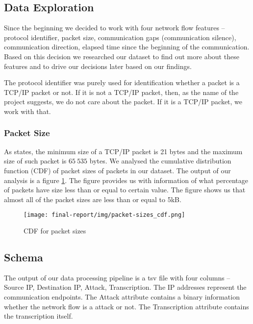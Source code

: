 \documentclass{article}
\begin{document}
    \subsection{Data Exploration}\label{sec-dataset-exploration}
    Since the beginning we decided to work with four network flow features -- protocol identifier, packet size, communication gaps (communication silence), communication direction, elapsed time since the beginning of the communication. Based on this decision we researched our dataset to find out more about these features and to drive our decisions later based on our findings.

    The protocol identifier was purely used for identification whether a packet is a TCP/IP packet or not. If it is not a TCP/IP packet, then, as the name of the project suggests, we do not care about the packet. If it is a TCP/IP packet, we work with that.

    \subsubsection{Packet Size}
    As \cite{oreilly-tcp} states, the minimum size of a TCP/IP packet is 21 bytes and the maximum size of such packet is $65\ 535$ bytes. We analysed the cumulative distribution function (CDF) of packet sizes of packets in our dataset. The output of our analysis is a figure \ref{fig-cdf-packet-sizes}. The figure provides us with information of what percentage of packets have size less than or equal to certain value. The figure shows us that almost all of the packet sizes are less than or equal to 5kB.

    \begin{figure}[h!]
        \centering
        \texttt{[image: final-report/img/packet-sizes\_cdf.png]}
        \caption{CDF for packet sizes}
        \label{fig-cdf-packet-sizes}
    \end{figure}



    \subsection{Schema}\label{sec-schema}
    The output of our data processing pipeline is a tsv file with four columns -- Source IP, Destination IP, Attack, Transcription. The IP addresses represent the communication endpoints. The Attack attribute contains a binary information whether the network flow is a attack or not. The Transcription attribute contains the transcription itself.
\end{document}
